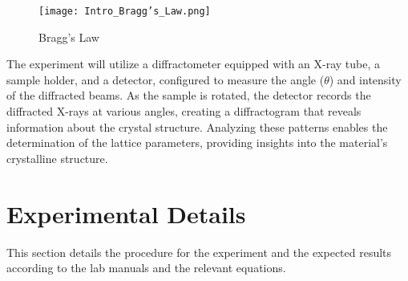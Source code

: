 \documentclass[11pt]{article}
\begin{document}
	\begin{figure}[htbp]
		\centering
		\texttt{[image: Intro\_Bragg's\_Law.png]}
		\caption{Bragg's Law}
	\end{figure}
	
	The experiment will utilize a diffractometer equipped with an X-ray tube, a sample holder, and a detector, configured to measure the angle (\(\theta\)) and intensity of the diffracted beams. As the sample is rotated, the detector records the diffracted X-rays at various angles, creating a diffractogram that reveals information about the crystal structure. Analyzing these patterns enables the determination of the lattice parameters, providing insights into the material’s crystalline structure.
	
\clearpage
	
	\section{Experimental Details}
	
	This section details the procedure for the experiment and the expected results according to the lab manuals and the relevant equations.
\end{document}
